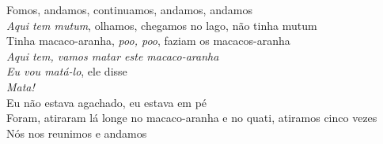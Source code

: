 \begin{linenumbers}\begingroup\raggedright
 
\noindent   Fomos, andamos, continuamos, andamos, andamos\\
  \emph{Aqui tem mutum}, olhamos, chegamos no lago, não tinha mutum\\
  Tinha macaco-aranha, \emph{poo, poo}, faziam os macacos-aranha\\
  \emph{Aqui tem, vamos matar este macaco-aranha}\\
  \emph{Eu vou matá-lo}, ele disse\\
  \emph{Mata!}\\
  Eu não estava agachado, eu estava em pé\\
  Foram, atiraram lá longe no macaco-aranha e no quati, atiramos cinco vezes\\
  Nós nos reunimos e andamos
 
\end{linenumbers}\endgroup

\bigskip

